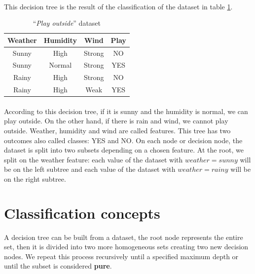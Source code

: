 \documentclass[12pt]{report}
\theoremstyle{definition}
\theoremstyle{definition}
\theoremstyle{definition}
\begin{document}
\paragraph{} This decision tree is the result of the classification of the dataset in table \ref{fig:dataweather}.

\begin{table}[ht]
    \centering
    \begin{tabular}{||c c c c||} 
    \hline
    Weather & Humidity & Wind & Play\\[0.5ex]
    \hline\hline
    Sunny & High & Strong & NO\\ 
    Sunny & Normal & Strong & YES\\
    Rainy & High & Strong & NO\\
    Rainy & High & Weak & YES\\ 
    \hline
    \end{tabular}
    \caption{``\textit{Play outside}'' dataset}
    \label{fig:dataweather}
\end{table}

\paragraph{} According to this decision tree, if it is sunny and the humidity is normal, we can play outside.
On the other hand, if there is rain and wind, we cannot play outside. Weather, humidity and wind are called
features. This tree has two outcomes also called classes: YES and NO. On each node or decision node, the dataset
is split into two subsets depending on a chosen feature. At the root, we split on the weather feature: each
value of the dataset with $weather = sunny$ will be on the left subtree and each value of the dataset with
$weather = rainy$ will be on the right subtree.


\section{Classification concepts}
\paragraph{} A decision tree can be built from a dataset, the root node represents the entire set, then it is
divided into two more homogeneous sets creating two new decision nodes. We repeat this process recursively
until a specified maximum depth or until the subset is considered \textbf{pure}.
\end{document}
